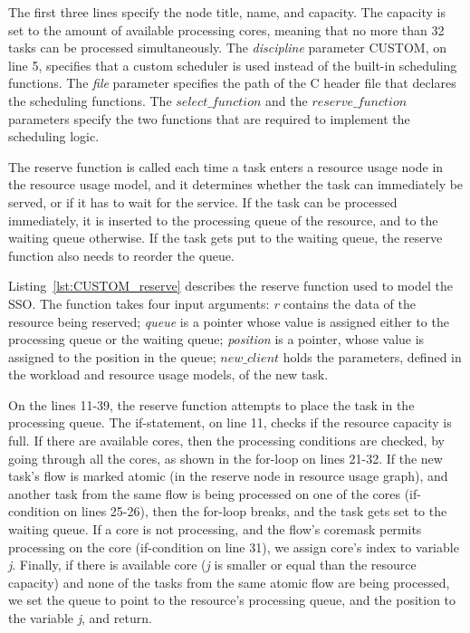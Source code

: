 

The first three lines specify the node title, name, and capacity. The capacity is set to the amount of available processing cores, meaning that no more than 32 tasks can be processed simultaneously. The \emph{discipline} parameter \mbox{CUSTOM}, on line 5, specifies that a custom scheduler is used instead of the built-in scheduling functions. The \emph{file} parameter specifies the path of the C header file that declares the scheduling functions. The \emph{$select\_function$} and the \emph{$reserve\_function$} parameters specify the two functions that are required to implement the scheduling logic.

The reserve function is called each time a task enters a resource usage node in the resource usage model, and it determines whether the task can immediately be served, or if it has to wait for the service. If the task can be processed immediately, it is inserted to the processing queue of the resource, and to the waiting queue otherwise. If the task gets put to the waiting queue, the reserve function also needs to reorder the queue.

Listing~\ref{lst:CUSTOM_reserve} describes the reserve function used to model the SSO. The function takes four input arguments: \emph{r} contains the data of the resource being reserved; \emph{queue} is a pointer whose value is assigned either to the processing queue or the waiting queue; \emph{position} is a pointer, whose value is assigned to the position in the queue; \emph{$new\_client$} holds the parameters, defined in the workload and resource usage models, of the new task.



On the lines 11-39, the reserve function attempts to place the task in the processing queue. The if-statement, on line 11, checks if the resource capacity is full. If there are available cores, then the processing conditions are checked, by going through all the cores, as shown in the for-loop on lines 21-32. If the new task's flow is marked atomic (in the reserve node in resource usage graph), and another task from the same flow is being processed on one of the cores (if-condition on lines 25-26), then the for-loop breaks, and the task gets set to the waiting queue. If a core is not processing, and the flow's coremask permits processing on the core (if-condition on line 31), we assign core's index to variable \emph{j}. Finally, if there is available core (\emph{j} is smaller or equal than the resource capacity) and none of the tasks from the same atomic flow are being processed, we set the queue to point to the resource's processing queue, and the position to the variable \emph{j}, and return.

